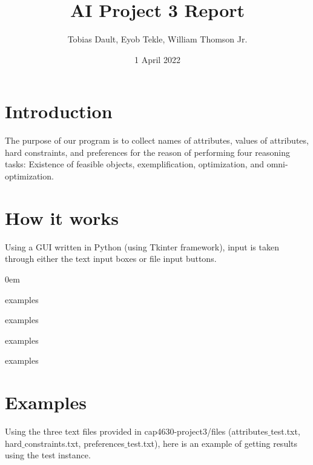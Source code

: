 \documentclass[11pt]{article}
\title{\textbf{AI Project 3 Report}}
\author{Tobias Dault, Eyob Tekle, William Thomson Jr.}
\date{1 April 2022}
\begin{document}
\maketitle
\thispagestyle{empty}

\section{Introduction}
The purpose of our program is to collect names of attributes, values of attributes, hard constraints, and preferences for the reason of performing four reasoning tasks: Existence of feasible objects, exemplification, optimization, and omni-optimization.

\section{How it works}
Using a GUI written in Python (using Tkinter framework), input is taken through either the text input boxes or file input buttons.
\begin{description}
\addtolength{\itemindent}{0.80cm}
\itemsep0em 
\item[Binary Attributes] examples
\item[Hard Constraints] examples
\item[Logics] examples
\item[Reading Output] examples
\end{description}

\section{Examples}
Using the three text files provided in cap4630-project3/files (attributes$\_$test.txt, hard$\_$constraints.txt, preferences$\_$test.txt), here is an example of getting results using the test instance.
\end{document}
